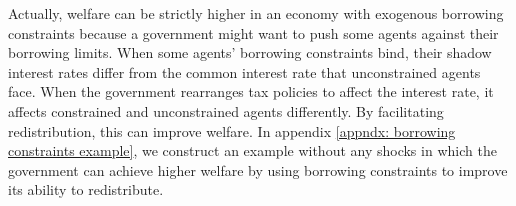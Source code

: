 \documentclass[thmsb,11pt]{article}
\begin{document}
Actually, welfare can  be strictly higher in an economy  with exogenous
borrowing constraints  because  a government might want to
push some agents against their borrowing limits. When some agents' borrowing
constraints bind, their shadow interest rates differ from the
common interest rate that unconstrained agents face. When the government rearranges tax
policies to  affect the  interest rate, it affects constrained and unconstrained agents
 differently.  By facilitating
redistribution, this can improve welfare. %
In appendix \ref{appndx: borrowing constraints example}, we construct an example without any
shocks in which the government can achieve higher welfare by using borrowing
constraints to improve its ability to redistribute.
% 
\end{document}
